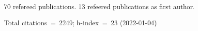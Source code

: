 70 refereed publications. 13 refeered publications as first author.

Total citations~=~2249; h-index~=~23 (2022-01-04)
